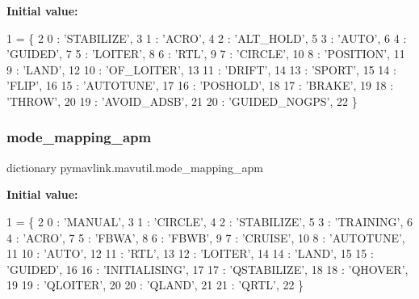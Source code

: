 {\bfseries Initial value\+:}
\begin{DoxyCode}
1 =  \{
2     0 : \textcolor{stringliteral}{'STABILIZE'},
3     1 : \textcolor{stringliteral}{'ACRO'},
4     2 : \textcolor{stringliteral}{'ALT\_HOLD'},
5     3 : \textcolor{stringliteral}{'AUTO'},
6     4 : \textcolor{stringliteral}{'GUIDED'},
7     5 : \textcolor{stringliteral}{'LOITER'},
8     6 : \textcolor{stringliteral}{'RTL'},
9     7 : \textcolor{stringliteral}{'CIRCLE'},
10     8 : \textcolor{stringliteral}{'POSITION'},
11     9 : \textcolor{stringliteral}{'LAND'},
12     10 : \textcolor{stringliteral}{'OF\_LOITER'},
13     11 : \textcolor{stringliteral}{'DRIFT'},
14     13 : \textcolor{stringliteral}{'SPORT'},
15     14 : \textcolor{stringliteral}{'FLIP'},
16     15 : \textcolor{stringliteral}{'AUTOTUNE'},
17     16 : \textcolor{stringliteral}{'POSHOLD'},
18     17 : \textcolor{stringliteral}{'BRAKE'},
19     18 : \textcolor{stringliteral}{'THROW'},
20     19 : \textcolor{stringliteral}{'AVOID\_ADSB'},
21     20 : \textcolor{stringliteral}{'GUIDED\_NOGPS'},
22 \}
\end{DoxyCode}
\mbox{\label{namespacepymavlink_1_1mavutil_a023b89a21397ad637968300c0fc9a1f1}} 
\subsubsection{\texorpdfstring{mode\+\_\+mapping\+\_\+apm}{mode\_mapping\_apm}}
{\footnotesize\ttfamily dictionary pymavlink.\+mavutil.\+mode\+\_\+mapping\+\_\+apm}

{\bfseries Initial value\+:}
\begin{DoxyCode}
1 =  \{
2     0 : \textcolor{stringliteral}{'MANUAL'},
3     1 : \textcolor{stringliteral}{'CIRCLE'},
4     2 : \textcolor{stringliteral}{'STABILIZE'},
5     3 : \textcolor{stringliteral}{'TRAINING'},
6     4 : \textcolor{stringliteral}{'ACRO'},
7     5 : \textcolor{stringliteral}{'FBWA'},
8     6 : \textcolor{stringliteral}{'FBWB'},
9     7 : \textcolor{stringliteral}{'CRUISE'},
10     8 : \textcolor{stringliteral}{'AUTOTUNE'},
11     10 : \textcolor{stringliteral}{'AUTO'},
12     11 : \textcolor{stringliteral}{'RTL'},
13     12 : \textcolor{stringliteral}{'LOITER'},
14     14 : \textcolor{stringliteral}{'LAND'},
15     15 : \textcolor{stringliteral}{'GUIDED'},
16     16 : \textcolor{stringliteral}{'INITIALISING'},
17     17 : \textcolor{stringliteral}{'QSTABILIZE'},
18     18 : \textcolor{stringliteral}{'QHOVER'},
19     19 : \textcolor{stringliteral}{'QLOITER'},
20     20 : \textcolor{stringliteral}{'QLAND'},
21     21 : \textcolor{stringliteral}{'QRTL'},
22     \}
\end{DoxyCode}
\mbox{\label{namespacepymavlink_1_1mavutil_a7cfdbccdb707b693735a98793d4475ce}} 
